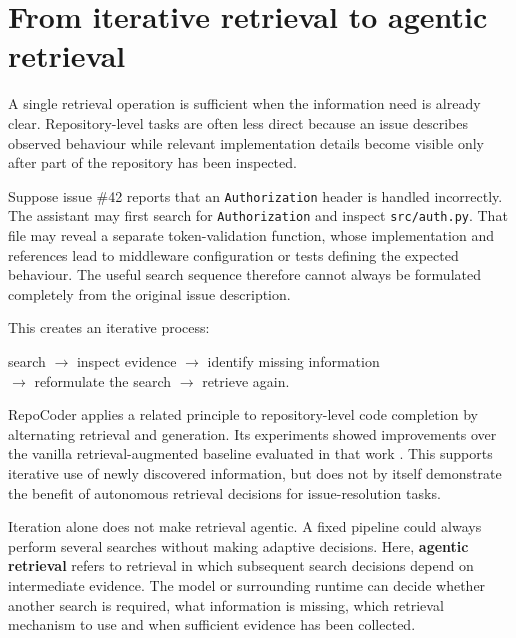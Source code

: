 \section{From iterative retrieval to agentic retrieval}
\label{sec:agentic-retrieval}

{\setlength{\emergencystretch}{2em}
A single retrieval operation is sufficient when the information need is already clear. Repository-level tasks are often less direct because an issue describes observed behaviour while relevant implementation details become visible only after part of the repository has been inspected.\par}

Suppose issue \#42 reports that an \texttt{Authorization} header is handled incorrectly. The assistant may first search for \texttt{Authorization} and inspect \texttt{src/auth.py}. That file may reveal a separate token-validation function, whose implementation and references lead to middleware configuration or tests defining the expected behaviour. The useful search sequence therefore cannot always be formulated completely from the original issue description.

This creates an iterative process:

\begin{center}
\small\singlespacing
search \(\rightarrow\) inspect evidence \(\rightarrow\) identify missing information
\\ \(\rightarrow\) reformulate the search \(\rightarrow\) retrieve again.
\end{center}

RepoCoder applies a related principle to repository-level code completion by alternating retrieval and generation. Its experiments showed improvements over the vanilla retrieval-augmented baseline evaluated in that work \parencite{zhang2023repocoder}. This supports iterative use of newly discovered information, but does not by itself demonstrate the benefit of autonomous retrieval decisions for issue-resolution tasks.

Iteration alone does not make retrieval agentic. A fixed pipeline could always perform several searches without making adaptive decisions. Here, \textbf{agentic retrieval} refers to retrieval in which subsequent search decisions depend on intermediate evidence. The model or surrounding runtime can decide whether another search is required, what information is missing, which retrieval mechanism to use and when sufficient evidence has been collected.


